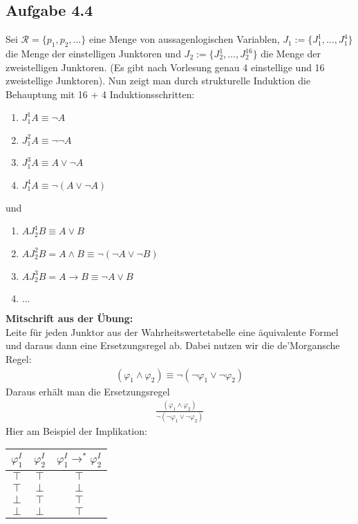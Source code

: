 \subsection{Aufgabe 4.4}
Sei $\mathcal{R}=\lbrace p_1,p_2,\ldots\rbrace$ eine Menge von aussagenlogischen Variablen, $J_1:=\lbrace J_1^1,\ldots,J_1^4\rbrace$ die Menge der einstelligen Junktoren und $J_2:=\lbrace J_2^1,\ldots,J_2^{16}\rbrace$ die Menge der zweistelligen Junktoren. 
(Es gibt nach Vorlesung genau 4 einstellige und 16 zweistellige Junktoren). 
Nun zeigt man durch strukturelle Induktion die Behauptung mit 16 + 4 Induktionsschritten:
\begin{enumerate}
	\item $J_1^1 A\equiv\neg A$
	\item $J_1^2 A\equiv\neg\neg A$
	\item $J_1^3 A\equiv A\vee\neg A$
	\item $J_1^4 A\equiv\neg(A\vee\neg A)$
\end{enumerate}
und
\begin{enumerate}
	\item $A J_2^1 B\equiv A\vee B$
	\item $A J_2^2 B=A\wedge B\equiv\neg(\neg A\vee\neg B)$
	\item $A J_2^3 B=A\to B\equiv\neg A\vee B$
	\item $\ldots$
\end{enumerate}

\textbf{Mitschrift aus der Übung:}\\
Leite für jeden Junktor aus der Wahrheitswertetabelle eine äquivalente Formel und daraus dann eine Ersetzungsregel ab. 
Dabei nutzen wir die de'Morgansche Regel:
\begin{align*}
	(\varphi_1\wedge\varphi_2)\equiv\neg(\neg\varphi_1\vee\neg\varphi_2)
\end{align*}
Daraus erhält man die Ersetzungsregel
\begin{align}\label{4.4Ersetzungsregel}
	\frac{(\varphi_1\wedge\varphi_2)}{\neg(\neg\varphi_1\vee\neg\varphi_2)}
\end{align}
Hier am Beispiel der Implikation:\\
\begin{tabular}{c|c||c}
	$\varphi_1^I$ & $\varphi_2^I$ & $\varphi_1^I\to^\ast\varphi_2^I$ \\ \hline
	$\top$ & $\top$ & $\top$\\
	$\top$ & $\bot$ & $\bot$\\
	$\bot$ & $\top$ & $\top$\\
	$\bot$ & $\bot$ & $\top$
\end{tabular}

